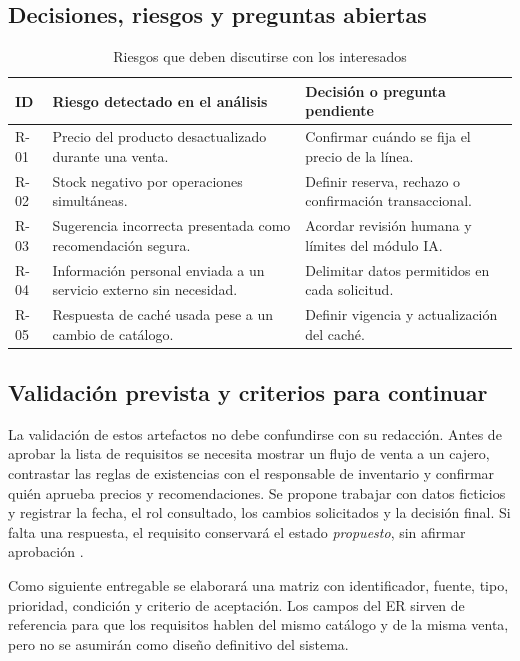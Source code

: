 \subsection{Decisiones, riesgos y preguntas abiertas}
\begin{table}[!ht]
\centering\scriptsize
\caption{Riesgos que deben discutirse con los interesados}
\label{tab:riesgosviernes}
\begin{tabularx}{\columnwidth}{@{}P{0.65cm}Y Y@{}}
\toprule ID & Riesgo detectado en el análisis & Decisión o pregunta pendiente\\\midrule
R-01 & Precio del producto desactualizado durante una venta. & Confirmar cuándo se fija el precio de la línea.\\
R-02 & Stock negativo por operaciones simultáneas. & Definir reserva, rechazo o confirmación transaccional.\\
R-03 & Sugerencia incorrecta presentada como recomendación segura. & Acordar revisión humana y límites del módulo IA.\\
R-04 & Información personal enviada a un servicio externo sin necesidad. & Delimitar datos permitidos en cada solicitud.\\
R-05 & Respuesta de caché usada pese a un cambio de catálogo. & Definir vigencia y actualización del caché.\\
\bottomrule
\end{tabularx}
\end{table}

\subsection{Validación prevista y criterios para continuar}
La validación de estos artefactos no debe confundirse con su redacción. Antes de aprobar la lista de requisitos se necesita mostrar un flujo de venta a un cajero, contrastar las reglas de existencias con el responsable de inventario y confirmar quién aprueba precios y recomendaciones. Se propone trabajar con datos ficticios y registrar la fecha, el rol consultado, los cambios solicitados y la decisión final. Si falta una respuesta, el requisito conservará el estado \emph{propuesto}, sin afirmar aprobación \cite{iso29148,ferrari2022}.

Como siguiente entregable se elaborará una matriz con identificador, fuente, tipo, prioridad, condición y criterio de aceptación. Los campos del ER sirven de referencia para que los requisitos hablen del mismo catálogo y de la misma venta, pero no se asumirán como diseño definitivo del sistema.
